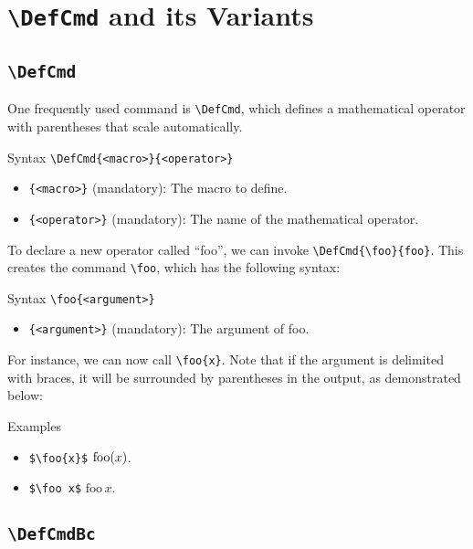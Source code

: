 \section{\texttt{\textbackslash DefCmd} and its Variants}

\subsection{\texttt{\textbackslash DefCmd}}

One frequently used command is \verb|\DefCmd|, which defines a mathematical operator with parentheses that scale automatically.

\begin{myframe}{Syntax }
    \verb|\DefCmd{<macro>}{<operator>}|
    \begin{itemize}
        \item \verb|{<macro>}| (mandatory): The macro to define.
        \item \verb|{<operator>}| (mandatory): The name of the mathematical operator.
    \end{itemize}
\end{myframe}

To declare a new operator called ``foo'', we can invoke \verb|\DefCmd{\foo}{foo}|. This creates the command \verb|\foo|, which has the following syntax:

\begin{myframe}{Syntax }
    \verb|\foo{<argument>}|
    \begin{itemize}
        \item \verb|{<argument>}| (mandatory): The argument of foo.
    \end{itemize}
\end{myframe}

For instance, we can now call \verb|\foo{x}|. Note that if the argument is delimited with braces, it will be surrounded by parentheses in the output, as demonstrated below: 

\begin{myframe}{Examples }
    \begin{itemize}
        \item \verb|$\foo{x}$| \produces{} $\mathrm{foo}{\left( x \right)}$.
        \item \verb|$\foo x$| \produces{} $\mathrm{foo}\,x$.
    \end{itemize}
\end{myframe}

\subsection{\texttt{\textbackslash DefCmdBc}}

